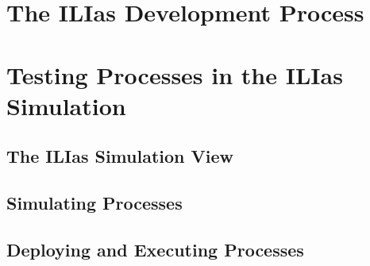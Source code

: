 
\section{The ILIas Development Process}






\section{Testing Processes in the ILIas Simulation}


\subsection{The ILIas Simulation View}

\subsection{Simulating Processes}

\subsection{Deploying and Executing Processes}



